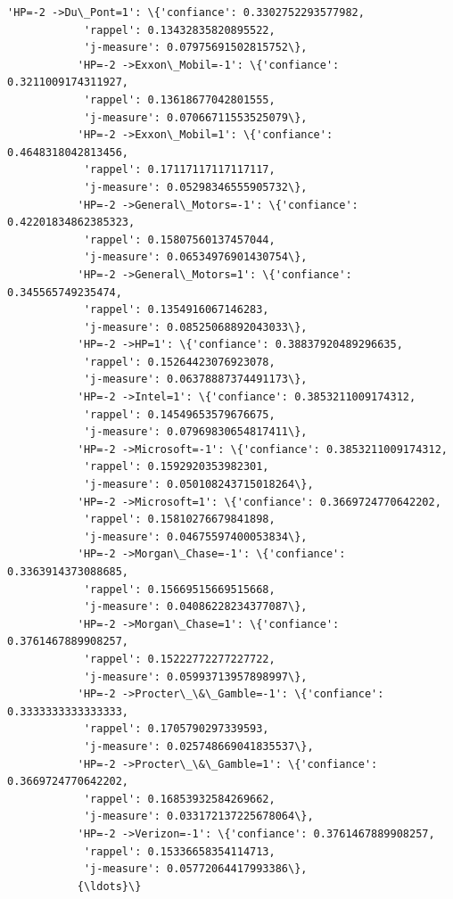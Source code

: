 \documentclass[11pt]{article}
\begin{document}
\begin{Verbatim}[commandchars=\\\{\}]
           'HP=-2 ->Du\_Pont=1': \{'confiance': 0.3302752293577982,
            'rappel': 0.13432835820895522,
            'j-measure': 0.07975691502815752\},
           'HP=-2 ->Exxon\_Mobil=-1': \{'confiance': 0.3211009174311927,
            'rappel': 0.13618677042801555,
            'j-measure': 0.07066711553525079\},
           'HP=-2 ->Exxon\_Mobil=1': \{'confiance': 0.4648318042813456,
            'rappel': 0.17117117117117117,
            'j-measure': 0.05298346555905732\},
           'HP=-2 ->General\_Motors=-1': \{'confiance': 0.42201834862385323,
            'rappel': 0.15807560137457044,
            'j-measure': 0.06534976901430754\},
           'HP=-2 ->General\_Motors=1': \{'confiance': 0.345565749235474,
            'rappel': 0.1354916067146283,
            'j-measure': 0.08525068892043033\},
           'HP=-2 ->HP=1': \{'confiance': 0.38837920489296635,
            'rappel': 0.15264423076923078,
            'j-measure': 0.06378887374491173\},
           'HP=-2 ->Intel=1': \{'confiance': 0.3853211009174312,
            'rappel': 0.14549653579676675,
            'j-measure': 0.07969830654817411\},
           'HP=-2 ->Microsoft=-1': \{'confiance': 0.3853211009174312,
            'rappel': 0.1592920353982301,
            'j-measure': 0.050108243715018264\},
           'HP=-2 ->Microsoft=1': \{'confiance': 0.3669724770642202,
            'rappel': 0.15810276679841898,
            'j-measure': 0.04675597400053834\},
           'HP=-2 ->Morgan\_Chase=-1': \{'confiance': 0.3363914373088685,
            'rappel': 0.15669515669515668,
            'j-measure': 0.04086228234377087\},
           'HP=-2 ->Morgan\_Chase=1': \{'confiance': 0.3761467889908257,
            'rappel': 0.15222772277227722,
            'j-measure': 0.05993713957898997\},
           'HP=-2 ->Procter\_\&\_Gamble=-1': \{'confiance': 0.3333333333333333,
            'rappel': 0.1705790297339593,
            'j-measure': 0.025748669041835537\},
           'HP=-2 ->Procter\_\&\_Gamble=1': \{'confiance': 0.3669724770642202,
            'rappel': 0.16853932584269662,
            'j-measure': 0.033172137225678064\},
           'HP=-2 ->Verizon=-1': \{'confiance': 0.3761467889908257,
            'rappel': 0.15336658354114713,
            'j-measure': 0.05772064417993386\},
           {\ldots}\}
\end{Verbatim}
            
\end{document}
